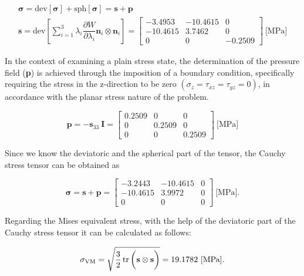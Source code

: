 \documentclass[12pt]{article}
\newcommand{\tens}[1]{%
  \mathbin{\mathop{\otimes}\limits_{#1}}%
}
\begin{document}
\begin{gather}
  \bm{\sigma} = \text{dev} \left[ \bm{\sigma} \right] + \text{sph} \left[ \bm{\sigma} \right] = \textbf{s} + \textbf{p} \\
  \textbf{s} = \text{dev} \left[ \sum_{i=1}^{3} \lambda_i \dfrac{\partial W}{\partial \lambda_i} \textbf{n}_i \tens{} \textbf{n}_i \right] = \displaystyle \left[\begin{matrix}-3.4953 & -10.4615 & 0\\-10.4615 & 3.7462 & 0\\0 & 0 & -0.2509\end{matrix}\right]~ \text{[MPa]}
\end{gather}

\noindent In the context of examining a plain stress state, the determination of the pressure field (\textbf{p}) is achieved through the imposition of a boundary condition, specifically requiring the stress in the z-direction to be zero $\left( \sigma_z = \tau_{xz} = \tau_{yz} = 0 \right)$, in accordance with the planar stress nature of the problem.

\begin{equation}
  \textbf{p} = - \textbf{s}_{33} ~ \textbf{I} = \displaystyle \left[\begin{matrix}0.2509 & 0 & 0\\0 & 0.2509 & 0\\0 & 0 & 0.2509\end{matrix}\right]  ~ \text{[MPa]}
\end{equation}

\noindent Since we know the deviatoric and the spherical part of the tensor, the Cauchy stress tensor can be obtained as

\begin{equation}
  \bm{\sigma} = \textbf{s} + \textbf{p}  = \displaystyle \left[\begin{matrix}-3.2443 & -10.4615 & 0\\ -10.4615 & 3.9972 & 0\\0 & 0 & 0\end{matrix}\right]  ~ \text{[MPa]}.
\end{equation}

\noindent Regarding the Mises equivalent stress, with the help of the deviatoric part of the Cauchy stress tensor it can be calculated as follows:

\begin{equation}
  \sigma_{\text{VM}} = \sqrt{\frac{3}{2} \tr \left( \textbf{s} \tens{} \textbf{s} \right) } = 19.1782 ~ \text{[MPa]}.
\end{equation}

\newpage
\label{page1}


\end{document}
